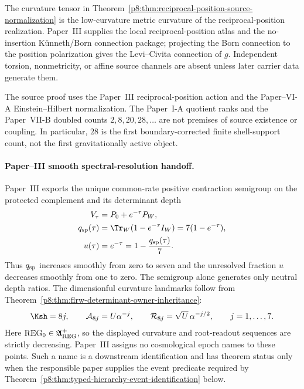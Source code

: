\documentclass[12pt,a4paper]{article}
\begin{document}
\begin{remark}
\label{p8:rem:low-curvature-levi-civita-channel}
The curvature tensor in
Theorem~\ref{p8:thm:reciprocal-position-source-normalization} is the
low-curvature metric curvature of the reciprocal-position realization.
Paper~III supplies the local reciprocal-position atlas and the no-insertion
K\"unneth/Born connection package; projecting the Born connection to the
position polarization gives the Levi--Civita connection of \(g\).  Independent
torsion, nonmetricity, or affine source channels are absent unless later
carrier data generate them.
\end{remark}

\begin{remark}
\label{p8:rem:no-downstream-shell-count-use}
The source proof uses the Paper~III reciprocal-position action and the
Paper--VI-A Einstein--Hilbert normalization.  The Paper~I-A quotient ranks and
the Paper~VII-B doubled counts \(2,8,20,28,\ldots\) are not premises of source
existence or coupling.  In particular, \(28\) is the first boundary-corrected
finite shell-support count, not the first gravitationally active object.
\end{remark}

\paragraph{Paper--III smooth spectral-resolution handoff.}
Paper~III exports the unique common-rate positive contraction semigroup on the
protected complement and its determinant depth
\begin{align}
\label{p8:eq:p3-resolution-semigroup-import}
 V_\tau&=P_0+e^{-\tau}P_W,\\
 q_{\rm sp}(\tau)&=\Tr_W(1-e^{-\tau}I_W)
                  =7(1-e^{-\tau}),\\
 u(\tau)&=e^{-\tau}=1-\frac{q_{\rm sp}(\tau)}7.
\end{align}
Thus \(q_{\rm sp}\) increases smoothly from zero to seven and the unresolved
fraction \(u\) decreases smoothly from one to zero.  The semigroup alone
generates only neutral depth ratios.  The dimensionful curvature landmarks
follow from Theorem~\ref{p8:thm:flrw-determinant-owner-inheritance}:
\begin{equation}
\label{p8:eq:p3-seven-landmarks-import}
 \Ksh=8j,
 \qquad
 \mathcal A_{8j}=U\alpha^{-j},
 \qquad
 \mathcal R_{8j}=\sqrt U\,\alpha^{-j/2},
 \qquad j=1,\ldots,7.
\end{equation}
Here \(\mathrm{REG}_0\in\mathfrak A_{\rm REG}^{+}\), so the displayed
curvature and root-readout sequences are strictly decreasing.  Paper~III assigns no cosmological epoch names to these points.  Such a name is
a downstream identification and has theorem status only when the responsible
paper supplies the event predicate required by
Theorem~\ref{p8:thm:typed-hierarchy-event-identification} below.
\end{document}
